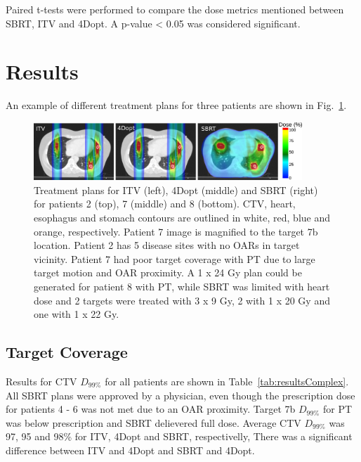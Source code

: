 Paired t-tests were performed to compare the dose metrics mentioned between SBRT, ITV and 4Dopt. A p-value < 0.05 was considered significant. 

\section{Results}

An example of different treatment plans for three patients are shown in Fig.~\ref{Fig:multiExample}. 

\newpage
\begin{figure}[H]
	\begin{center}
		\includegraphics[width=0.9\textwidth]{./ComplexPatients/Images/multiExample.png}
		\caption{Treatment plans for ITV (left), 4Dopt (middle) and SBRT (right) for patients 2 (top), 7 (middle) and 8 (bottom). 
		CTV, heart, esophagus and stomach contours are outlined in white, red, blue and orange,
		respectively. Patient 7 image is magnified to the target 7b location. Patient 2 has 5 disease sites with no OARs in target vicinity. Patient 7 had poor target coverage
		with PT due to large target motion and OAR proximity. A 1 x 24 Gy plan could be generated for patient 8 with PT, 
		while SBRT was limited with heart dose and 2 targets were treated with 3 x 9 Gy, 2 with 1 x 20 Gy and one with 1 x 22 Gy. }
		\label{Fig:multiExample}
	\end{center}
\end{figure}
\newpage
\subsection{Target Coverage}

Results for CTV $D_{99\%}$ for all patients are shown in Table~\ref{tab:resultsComplex}. All SBRT plans were approved by a physician, 
even though the prescription dose for patients 4 - 6 was not met due to an OAR proximity. Target 7b $D_{99\%}$ for PT was below prescription and SBRT delievered full dose.
Average CTV $D_{99\%}$ was 97, 95 and 98\% for ITV, 4Dopt and SBRT, respectivelly, There was a significant difference between ITV and 4Dopt and SBRT and 4Dopt.

